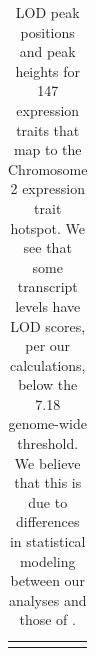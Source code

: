 \documentclass[oneside]{book}\usepackage[]{graphicx}\usepackage[]{color}
\begin{document}
\begin{appendices}
{\tiny
\begin{longtable}{lrr}
\caption{LOD peak positions and peak heights for 147 expression traits that map to the Chromosome 2 expression trait hotspot. We see that some transcript levels have LOD scores, per our calculations, below the 7.18 genome-wide threshold. We believe that this is due to differences in statistical modeling between our analyses and those of \citet{keller2018genetic}.}\label{tab:chr2-hot}\\ 
\hline \\


\end{longtable}}
\end{appendices}
\end{document}
